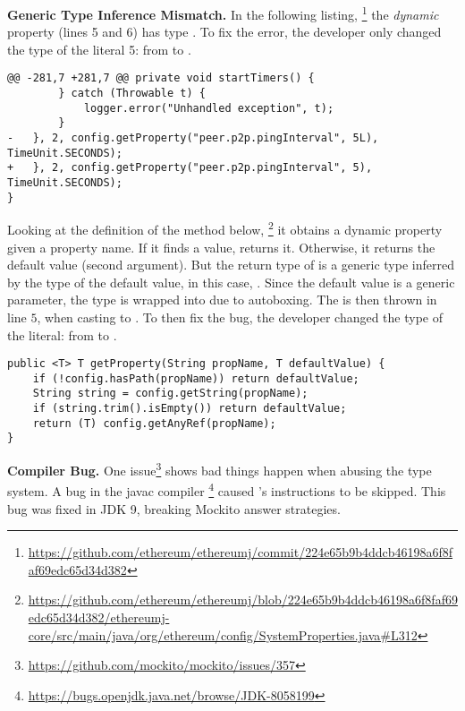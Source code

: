 \textbf{Generic Type Inference Mismatch.}
In the following listing,%
\footnote{\url{https://github.com/ethereum/ethereumj/commit/224e65b9b4ddcb46198a6f8faf69edc65d34d382}}
the \emph{dynamic} property  (lines 5 and 6) has type .
To fix the error, the developer only changed the type of the
literal 5: from  to .

\begin{lstlisting}[style=java]
@@ -281,7 +281,7 @@ private void startTimers() {
        } catch (Throwable t) {
            logger.error("Unhandled exception", t);
        }
-   }, 2, config.getProperty("peer.p2p.pingInterval", 5L), TimeUnit.SECONDS);
+   }, 2, config.getProperty("peer.p2p.pingInterval", 5), TimeUnit.SECONDS);
}
\end{lstlisting}

Looking at the definition of the  method below,%
\footnote{\url{https://github.com/ethereum/ethereumj/blob/224e65b9b4ddcb46198a6f8faf69edc65d34d382/ethereumj-core/src/main/java/org/ethereum/config/SystemProperties.java\#L312}}
it obtains a dynamic property given a property name.
If it finds a value, returns it.
Otherwise, it returns the default value (second argument).
But the return type of  is a generic type inferred
by the type of the default value, in this case, .
Since the default value is a generic parameter, the type  is wrapped into  due to autoboxing.
The  is then thrown in line $5$,
when casting  to .
To then fix the bug, the developer changed the type of the literal:
from  to .

\begin{lstlisting}[style=java]
public <T> T getProperty(String propName, T defaultValue) {
    if (!config.hasPath(propName)) return defaultValue;
    String string = config.getString(propName);
    if (string.trim().isEmpty()) return defaultValue;
    return (T) config.getAnyRef(propName);
}
\end{lstlisting}

\textbf{Compiler Bug.}
One issue\footnote{\url{https://github.com/mockito/mockito/issues/357}} shows bad things happen when abusing the type system.
A bug in the \textsf{javac} compiler%
\footnote{\url{https://bugs.openjdk.java.net/browse/JDK-8058199}}
caused \jvm{}'s  instructions to be skipped.
This bug was fixed in JDK 9, breaking Mockito answer strategies.
